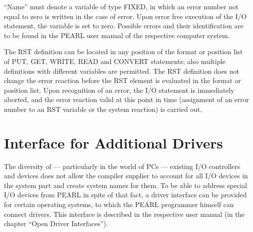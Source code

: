 ``Name'' must denote a variable of type FIXED, in which an error number
not equal to zero is written in the case of error. Upon error free
execution of the I/O statement, the variable is set to zero. Possible
errors and their identification are to be found in the PEARL user manual
of the respective computer system.

The RST definition can be located in any position of the format or
position list of PUT, GET, WRITE, READ and CONVERT statements; also
multiple definitions with different variables are permitted. The RST
definition does not change the error reaction before the RST element is
evaluated in the format or position list. Upon recognition of an error,
the I/O statement is immediately aborted, and the error reaction valid
at this point in time (assignment of an error number to an RST variable
or the system reaction) is carried out.

\section{Interface for Additional Drivers}   %
\label{sec_driver_interface}

The diversity of --- particularly in the world of PCs 
 --- existing I/O
controllers and devices does not allow the compiler supplier to account
for all I/O devices in the system part and create system names for them.
To be able to address special I/O devices from PEARL in spite of that
fact, a driver interface can be provided for certain operating systems,
to which the PEARL programmer himself can connect drivers. This
interface is described in the respective user manual (in the chapter
``Open Driver Interfaces'').


